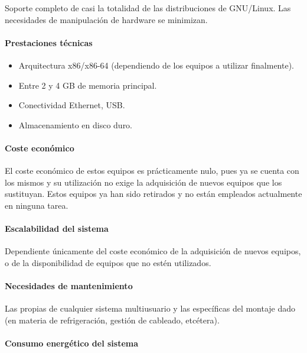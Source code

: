Soporte completo de casi la totalidad de las distribuciones de GNU/Linux. Las necesidades de manipulación de hardware se minimizan.

\paragraph{Prestaciones técnicas}
\begin{itemize}
\item Arquitectura x86/x86-64 (dependiendo de los equipos a utilizar finalmente).
\item Entre 2 y 4 GB de memoria principal.
\item Conectividad Ethernet, USB.
\item Almacenamiento en disco duro.
\end{itemize}

\paragraph{Coste económico\\}

El coste económico de estos equipos es prácticamente nulo, pues ya se cuenta con los mismos y su utilización no exige la adquisición de nuevos equipos que los sustituyan. Estos equipos ya han sido retirados y no están empleados actualmente en ninguna tarea.

\paragraph{Escalabilidad del sistema\\}

Dependiente únicamente del coste económico de la adquisición de nuevos equipos, o de la disponibilidad de equipos que no estén utilizados.

\paragraph{Necesidades de mantenimiento\\}

Las propias de cualquier sistema multiusuario y las específicas del montaje dado (en materia de refrigeración, gestión de cableado, etcétera).

\paragraph{Consumo energético del sistema\\}

